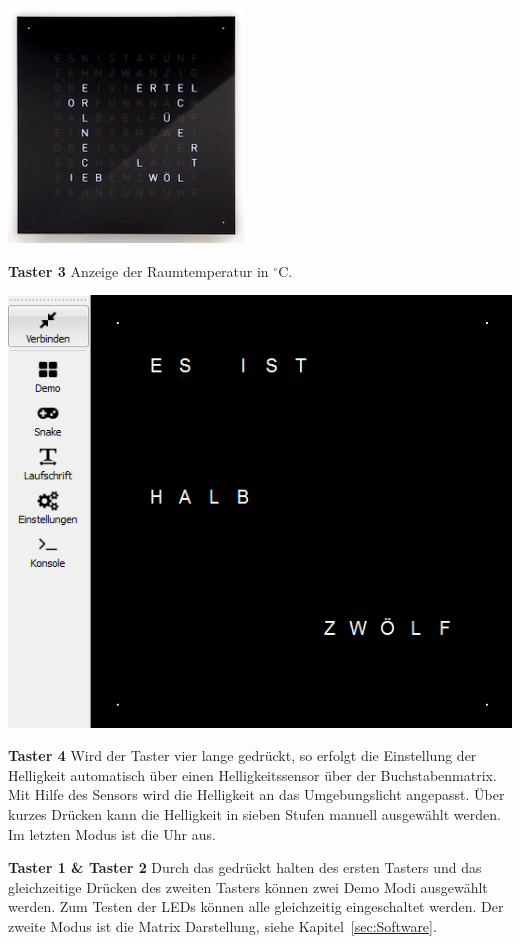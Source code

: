 \begin{multicols}{2}
{
\centering
\includegraphics[width=0.8\columnwidth]{Abbildungen/Funktionen/Sekunden_01}

}

\textbf{Taster 3} Anzeige der Raumtemperatur in $^\circ$C.

{
\centering
\includegraphics[width=0.8\columnwidth]{Abbildungen/Funktionen/Uhrzeit_01}

}

\textbf{Taster 4} Wird der Taster vier lange gedrückt, so erfolgt die Einstellung der Helligkeit automatisch über einen Helligkeitssensor über der Buchstabenmatrix. Mit Hilfe des Sensors wird die Helligkeit an das Umgebungslicht angepasst. 
Über kurzes Drücken kann die Helligkeit in sieben Stufen manuell ausgewählt werden. Im letzten Modus ist die Uhr aus.

\textbf{Taster 1 \& Taster 2 } Durch das gedrückt halten des ersten Tasters und das gleichzeitige Drücken des zweiten Tasters können zwei Demo Modi ausgewählt werden. Zum Testen der LEDs können alle gleichzeitig eingeschaltet werden. Der zweite Modus ist die Matrix Darstellung, siehe Kapitel~\ref{sec:Software}.

\end{multicols}